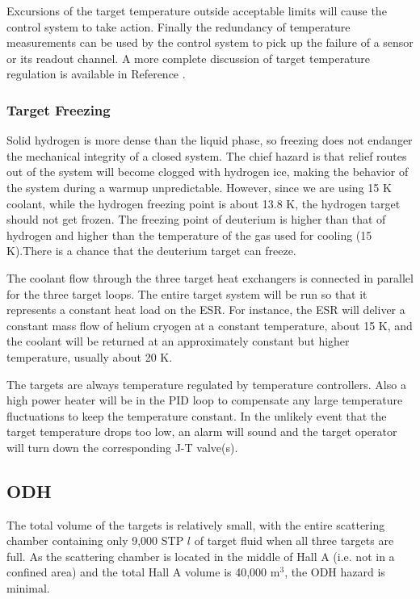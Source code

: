 {Excursions of the target temperature outside acceptable limits will
cause the control system to take action.
Finally the redundancy of temperature measurements can be used by the
control system to pick up the failure of a sensor or its readout channel.
A more complete discussion of target temperature regulation is available
in Reference \cite{bi:tgts}.

\subsubsection{Target Freezing}

Solid hydrogen is more dense than the liquid phase, so freezing does not
endanger the mechanical integrity of a closed system. The chief hazard is that
relief routes out of the system will become clogged with hydrogen ice,
making the behavior of the system during a warmup unpredictable. 
However, since we are using 15 K coolant, while the hydrogen freezing point
is about 13.8 K, the hydrogen target should not get frozen. 
The freezing point of deuterium is higher than that of hydrogen
and higher than the temperature of the gas used for
cooling (15 K).There is 
a chance that the deuterium target can freeze.

The coolant flow through the three target heat exchangers is
connected in parallel for the three target loops.
The entire target system will be run so that it
represents a constant heat load on the ESR. For instance,
the ESR will deliver
a constant mass flow of helium cryogen at a constant temperature, about
15 K, and the coolant will be returned at an approximately 
constant but higher temperature, usually about 20 K.

The targets are always temperature regulated by
temperature controllers. Also a high power heater will be in the PID loop
to compensate any large temperature fluctuations to keep the temperature 
constant.
In the unlikely event that the target temperature drops too low,
an alarm will sound and the target operator will turn down the corresponding
J-T valve(s). 

\subsection{ODH}

The total volume of the targets is relatively small, with the entire
scattering chamber containing only 9,000 STP $l$ of target
fluid when all three targets are full. As the scattering chamber
is located in the middle of Hall A
(i.e. not in a confined area) and the total Hall A volume is 40,000 m$^3$,
the ODH hazard is minimal.

}
